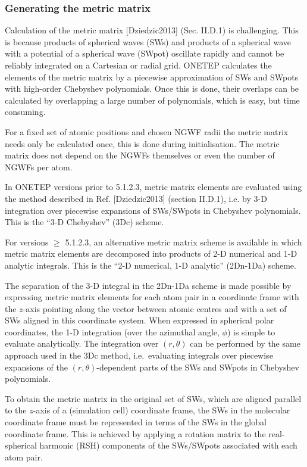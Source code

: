 \documentclass[letterpaper,10pt,english]{sphinxmanual}
\begin{document}
\subsubsection{Generating the metric matrix}
\label{\detokenize{hfx:generating-the-metric-matrix}}
Calculation of the metric matrix {[}Dziedzic2013{]} (Sec. II.D.1) is
challenging. This is because products of spherical waves (SWs) and
products of a spherical wave with a potential of a spherical wave
(SWpot) oscillate rapidly and cannot be reliably integrated on a
Cartesian or radial grid. ONETEP calculates the elements of the metric
matrix by a piecewise approximation of SWs and SWpots with high-order
Chebyshev polynomials. Once this is done, their overlaps can be
calculated by overlapping a large number of polynomials, which is easy,
but time consuming.

For a fixed set of atomic positions and chosen NGWF radii the metric
matrix needs only be calculated once, this is done during
initialisation. The metric matrix does not depend on the NGWFs
themselves or even the number of NGWFs per atom.

In ONETEP versions prior to 5.1.2.3, metric matrix elements are
evaluated using the method described in Ref. {[}Dziedzic2013{]} (section II.D.1), i.e. by
3-D integration over piecewise expansions of SWs/SWpots in Chebyshev
polynomials. This is the “3-D Chebyshev” (3Dc) scheme.

For versions \(\ge\) 5.1.2.3, an alternative metric matrix scheme is
available in which metric matrix elements are decomposed into products
of 2-D numerical and 1-D analytic integrals. This is the “2-D numerical,
1-D analytic” (2Dn-1Da) scheme.

The separation of the 3-D integral in the 2Dn-1Da scheme is made
possible by expressing metric matrix elements for each atom pair in a
 coordinate frame with the \(z\)-axis pointing along the
vector between atomic centres and with a set of SWs aligned in this
coordinate system. When expressed in spherical polar coordinates, the
1-D integration (over the azimuthal angle, \(\phi\)) is simple to
evaluate analytically. The integration over \((r,\theta)\) can be
performed by the same approach used in the 3Dc method, i.e. evaluating
integrals over piecewise expansions of the \((r,\theta)\)-dependent
parts of the SWs and SWpots in Chebyshev polynomials.

To obtain the metric matrix in the original set of SWs, which are
aligned parallel to the \(z\)-axis of a  (simulation cell)
coordinate frame, the SWs in the molecular coordinate frame must be
represented in terms of the SWs in the global coordinate frame. This is
achieved by applying a rotation matrix to the real-spherical harmonic
(RSH) components of the SWs/SWpots associated with each atom pair.
\end{document}

